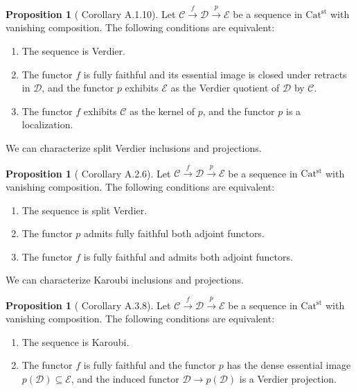\documentclass[a4paper,dvipdfmx,11pt,reqno]{amsart}
\newcommand{\C}{\mathcal{C}}
\newcommand{\D}{\mathcal{D}}
\newcommand{\E}{\mathcal{E}}
\newcommand{\Catst}{\mathrm{Cat^{st}}}
\theoremstyle{definition}
\newtheorem{proposition}[theorem]{Proposition}
\begin{document}
\begin{proposition}[\cite{CDH23} Corollary A.1.10] \label{CDH23.cor.A.1.10}
  Let $\C \xrightarrow{f} \D \xrightarrow{p} \E$ be a sequence in $\Catst$ with vanishing composition.
  The following conditions are equivalent:
  \begin{enumerate}
    \item The sequence is Verdier.
    \item The functor $f$ is fully faithful and its essential image is closed under retracts in $\D$, and the functor $p$ exhibits $\E$ as the Verdier quotient of $\D$ by $\C$.
    \item The functor $f$ exhibits $\C$ as the kernel of $p$, and the functor $p$ is a localization.
  \end{enumerate}
\end{proposition}

We can characterize split Verdier inclusions and projections.

\begin{proposition}[\cite{CDH23} Corollary A.2.6] \label{CDH23.cor.A.2.6}
  Let $\C \xrightarrow{f} \D \xrightarrow{p} \E$ be a sequence in $\Catst$ with vanishing composition.
  The following conditions are equivalent:
  \begin{enumerate}
    \item The sequence is split Verdier.
    \item The functor $p$ admits fully faithful both adjoint functors.
    \item The functor $f$ is fully faithful and admits both adjoint functors.
  \end{enumerate}
\end{proposition}

We can characterize Karoubi inclusions and projections.

\begin{proposition}[\cite{CDH23} Corollary A.3.8] \label{CDH23.cor.A.3.8}
  Let $\C \xrightarrow{f} \D \xrightarrow{p} \E$ be a sequence in $\Catst$ with vanishing composition.
  The following conditions are equivalent:
  \begin{enumerate}
    \item The sequence is Karoubi.
    \item The functor $f$ is fully faithful and the functor $p$ has the dense essential image $p(\D) \subseteq \E$, and the induced functor $\D \to p(\D)$ is a Verdier projection.
  \end{enumerate}
\end{proposition}
\end{document}
